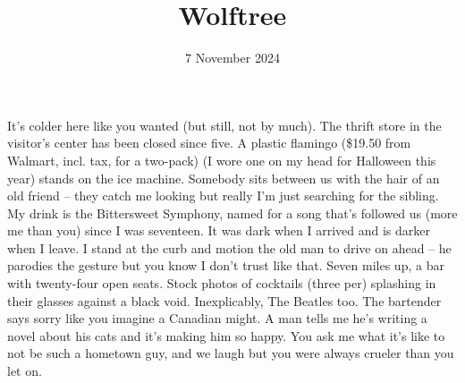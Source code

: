 \documentclass[11pt]{article}
\title{Wolftree}
\date{7 November 2024}
\newcommand{\BExcerpt}{}
\newcommand{\EExcerpt}{}
\begin{document}
    \maketitle
    \BExcerpt
    It's colder here like you wanted (but still, not by much). The thrift store in the visitor's center has been closed since five. A plastic flamingo (\$19.50 from Walmart, incl. tax, for a two-pack) (I wore one on my head for Halloween this year) stands on the ice machine. Somebody sits between us with the hair of an old friend -- they catch me looking but really I'm just searching for the sibling. My drink is the Bittersweet Symphony, named for a song that's followed us (more me than you) since I was seventeen. It was dark when I arrived and is darker when I leave. I stand at the curb and motion the old man to drive on ahead -- he parodies the gesture but you know I don't trust like that. Seven miles up, a bar with twenty-four open seats. Stock photos of cocktails (three per) splashing in their glasses against a black void. Inexplicably, The Beatles too. The bartender says sorry like you imagine a Canadian might. A man tells me he's writing a novel about his cats and it's making him so happy. You ask me what it's like to not be such a hometown guy, and we laugh but you were always crueler than you let on.
    \EExcerpt
\end{document}
